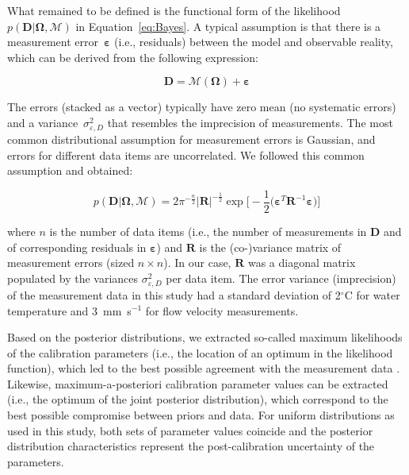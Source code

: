\documentclass[draft,linenumbers,onecolumn]{agujournal2019} %
\begin{document}
What remained to be defined is the functional form of the likelihood~$p(\mathbf{D} \vert \mathbf{\Omega}, \mathcal{M})$ in Equation~\ref{eq:Bayes}. A typical assumption is that there is a measurement error~$\boldsymbol{\varepsilon}$ (i.e., residuals) between the model and observable reality, which can be derived from the following expression:

\begin{equation}
	\mathbf{D} = \mathcal{M}(\mathbf{\Omega}) + \boldsymbol{\varepsilon}
	\label{eq:residuals}
\end{equation}

The errors (stacked as a vector) typically have zero mean (no systematic errors) and a variance~$\sigma^2_{\varepsilon,D}$ that resembles the imprecision of measurements. The most common distributional assumption for measurement errors is Gaussian, and errors for different data items are uncorrelated. We followed this common assumption and obtained:

\begin{equation}
	p(\mathbf{D} \vert \mathbf{\Omega},\mathcal{M}) = 
	2\pi^{-\frac{n}{2}}\vert \mathbf{R} \vert^{-\frac{1}{2}}
	\exp\bigg[
	-\frac{1}{2}\big( \boldsymbol{\varepsilon}^T \mathbf{R}^{-1} \boldsymbol{\varepsilon}
	\big)\bigg]
	\label{eq:like}
\end{equation}

where $n$ is the number of data items (i.e., the number of measurements in $\mathbf{D}$ and of corresponding residuals in $\boldsymbol{\varepsilon}$) and $\mathbf{R}$ is the (co-)variance matrix of measurement errors (sized $n\times n$). In our case, $\mathbf{R}$ was a diagonal matrix populated by the variances $\sigma^2_{\varepsilon,D}$ per data item. The error variance (imprecision) of the measurement data in this study had a standard deviation of 2$^{\circ}$C for water temperature and 3~mm~s$^{-1}$ for flow velocity measurements.

Based on the posterior distributions, we extracted so-called maximum likelihoods of the calibration parameters (i.e., the location of an optimum in the likelihood function), which led to the best possible agreement with the measurement data \cite{beckers_bayesian_2020}. Likewise, maximum-a-posteriori calibration parameter values can be extracted (i.e., the optimum of the joint posterior distribution), which correspond to the best possible compromise between priors and data. For uniform distributions as used in this study, both sets of parameter values coincide and the posterior distribution characteristics represent the post-calibration uncertainty of the parameters.
\end{document}

